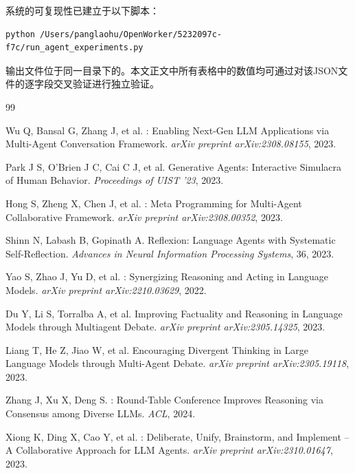 \documentclass[12pt,a4paper]{ctexart}
\begin{document}
系统的可复现性已建立于以下脚本：
\begin{verbatim}
python /Users/panglaohu/OpenWorker/5232097c-f7c/run_agent_experiments.py
\end{verbatim}
输出文件位于同一目录下的。本文正文中所有表格中的数值均可通过对该JSON文件的逐字段交叉验证进行独立验证。

\newpage
\begin{thebibliography}{99}

Wu Q, Bansal G, Zhang J, et al.
: Enabling Next-Gen LLM Applications via Multi-Agent Conversation Framework.
\newblock \emph{arXiv preprint arXiv:2308.08155}, 2023.

Park J S, O'Brien J C, Cai C J, et al.
\newblock Generative Agents: Interactive Simulacra of Human Behavior.
\newblock \emph{Proceedings of UIST '23}, 2023.

Hong S, Zheng X, Chen J, et al.
: Meta Programming for Multi-Agent Collaborative Framework.
\newblock \emph{arXiv preprint arXiv:2308.00352}, 2023.

Shinn N, Labash B, Gopinath A.
\newblock Reflexion: Language Agents with Systematic Self-Reflection.
\newblock \emph{Advances in Neural Information Processing Systems}, 36, 2023.

Yao S, Zhao J, Yu D, et al.
: Synergizing Reasoning and Acting in Language Models.
\newblock \emph{arXiv preprint arXiv:2210.03629}, 2022.

Du Y, Li S, Torralba A, et al.
\newblock Improving Factuality and Reasoning in Language Models through Multiagent Debate.
\newblock \emph{arXiv preprint arXiv:2305.14325}, 2023.

Liang T, He Z, Jiao W, et al.
\newblock Encouraging Divergent Thinking in Large Language Models through Multi-Agent Debate.
\newblock \emph{arXiv preprint arXiv:2305.19118}, 2023.

Zhang J, Xu X, Deng S.
: Round-Table Conference Improves Reasoning via Consensus among Diverse LLMs.
\newblock \emph{ACL}, 2024.

Xiong K, Ding X, Cao Y, et al.
: Deliberate, Unify, Brainstorm, and Implement -- A Collaborative Approach for LLM Agents.
\newblock \emph{arXiv preprint arXiv:2310.01647}, 2023.


\end{thebibliography}
\end{document}
